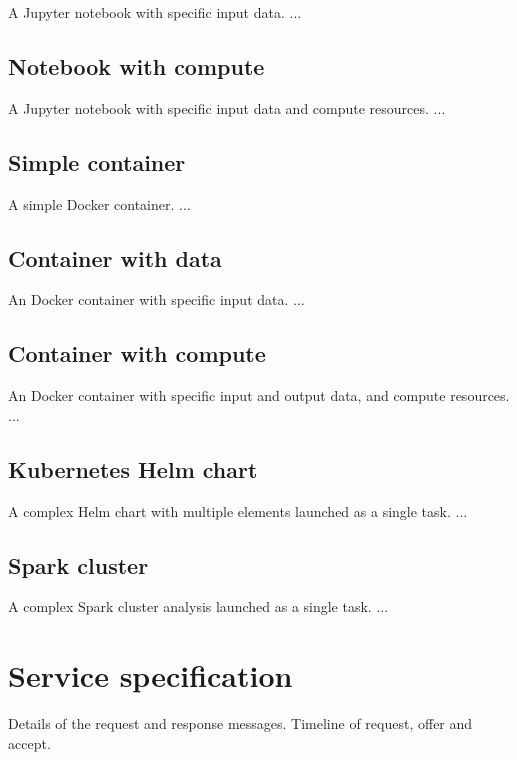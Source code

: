 \documentclass[11pt,a4paper]{ivoa}
\newcommand{\jupyternotebook} {Jupyter notebook}
\newcommand{\dockercontainer} {Docker container}
\begin{document}
A \jupyternotebook{} with specific input data.
...

\subsection{Notebook with compute}
\label{notebook-with-compute}

A \jupyternotebook{} with specific input data and compute resources.
...

\subsection{Simple container}
\label{simple-container}

A simple \dockercontainer{}.
...

\subsection{Container with data}
\label{container-with-data}

An \dockercontainer{} with specific input data.
...

\subsection{Container with compute}
\label{container-with-compute}

An \dockercontainer{} with specific input and output data, and compute resources.
...

\subsection{Kubernetes Helm chart}
\label{kubernetes-helm}

A complex Helm chart with multiple elements launched as a single task.
...

\subsection{Spark cluster}
\label{spark-cluster}

A complex Spark cluster analysis launched as a single task.
...

\pagebreak

\section{Service specification}
\label{service-specification}

Details of the request and response messages.
Timeline of request, offer and accept.
\end{document}
